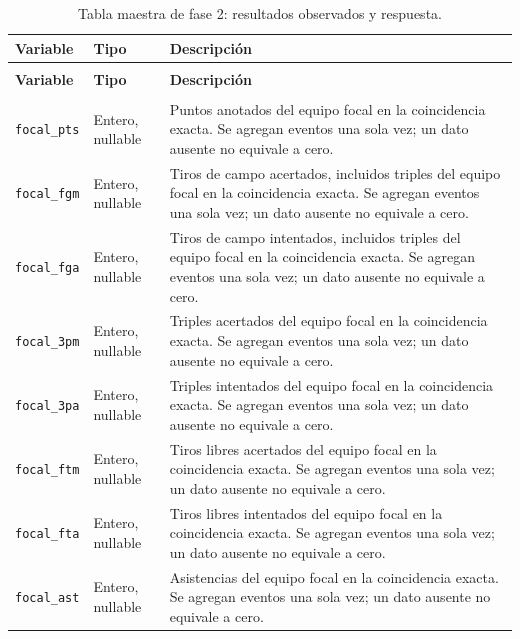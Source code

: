 \begin{longtable}{@{}>{\raggedright\arraybackslash}p{5.0cm}>{\raggedright\arraybackslash}p{1.9cm}>{\raggedright\arraybackslash}p{7.7cm}@{}}
\caption{Tabla maestra de fase 2: resultados observados y respuesta.}\label{tab:fase2-observados}\\
\toprule\textbf{Variable}&\textbf{Tipo}&\textbf{Descripción}\\\midrule\endfirsthead
\multicolumn{3}{l}{\small Continuación de la Tabla~\ref{tab:fase2-observados}}\\
\toprule\textbf{Variable}&\textbf{Tipo}&\textbf{Descripción}\\\midrule\endhead
\midrule\multicolumn{3}{r}{\small Continúa en la siguiente página}\\\endfoot
\bottomrule\endlastfoot
\texttt{focal\_\allowbreak pts} & Entero, nullable & Puntos anotados del equipo focal en la coincidencia exacta. Se agregan eventos una sola vez; un dato ausente no equivale a cero.\\
\texttt{focal\_\allowbreak fgm} & Entero, nullable & Tiros de campo acertados, incluidos triples del equipo focal en la coincidencia exacta. Se agregan eventos una sola vez; un dato ausente no equivale a cero.\\
\texttt{focal\_\allowbreak fga} & Entero, nullable & Tiros de campo intentados, incluidos triples del equipo focal en la coincidencia exacta. Se agregan eventos una sola vez; un dato ausente no equivale a cero.\\
\texttt{focal\_\allowbreak 3pm} & Entero, nullable & Triples acertados del equipo focal en la coincidencia exacta. Se agregan eventos una sola vez; un dato ausente no equivale a cero.\\
\texttt{focal\_\allowbreak 3pa} & Entero, nullable & Triples intentados del equipo focal en la coincidencia exacta. Se agregan eventos una sola vez; un dato ausente no equivale a cero.\\
\texttt{focal\_\allowbreak ftm} & Entero, nullable & Tiros libres acertados del equipo focal en la coincidencia exacta. Se agregan eventos una sola vez; un dato ausente no equivale a cero.\\
\texttt{focal\_\allowbreak fta} & Entero, nullable & Tiros libres intentados del equipo focal en la coincidencia exacta. Se agregan eventos una sola vez; un dato ausente no equivale a cero.\\
\texttt{focal\_\allowbreak ast} & Entero, nullable & Asistencias del equipo focal en la coincidencia exacta. Se agregan eventos una sola vez; un dato ausente no equivale a cero.\\

\end{longtable}
